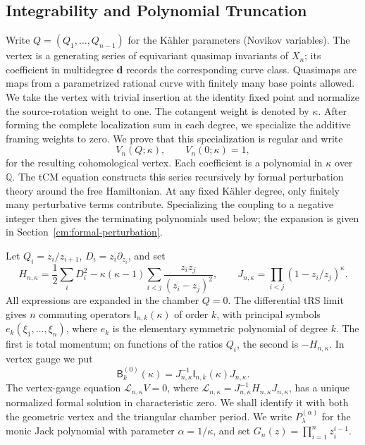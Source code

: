 \documentclass[11pt]{amsart}
\theoremstyle{definition}
\theoremstyle{remark}
\numberwithin{equation}{section}
\newcommand{\Q}{\mathbb Q}
\begin{document}
\subsection{Integrability and Polynomial Truncation}
Write $Q=(Q_1,\ldots,Q_{n-1})$ for the K\"ahler parameters
(Novikov variables). The vertex is a generating series of
equivariant quasimap invariants of $X_n$; its coefficient in
multidegree $\boldsymbol d$ records the corresponding curve class.
Quasimaps are maps from a parametrized
rational curve with finitely many base points allowed.
We take the vertex with trivial insertion at the identity
fixed point and normalize the source-rotation weight to one.
The cotangent weight is denoted by $\kappa$. After forming the
complete localization sum in each degree, we specialize the
additive framing weights to zero. We prove that this
specialization is regular and write
\[
 V_n(Q;\kappa),\qquad V_n(0;\kappa)=1,
\]
for the resulting cohomological vertex. Each coefficient is a
polynomial in $\kappa$ over $\Q$.
The tCM equation constructs this series recursively by formal
perturbation theory around the free Hamiltonian. At any fixed
K\"ahler degree, only finitely many perturbative terms contribute.
Specializing the coupling to a negative integer then gives the
terminating polynomials used below; the expansion is given in
Section~\ref{cm:formal-perturbation}.

Let $Q_i=z_i/z_{i+1}$, $D_i=z_i\partial_{z_i}$, and set
\begin{equation}\label{in:calogero}
 H_{n,\kappa}=\frac12\sum_iD_i^2
 -\kappa(\kappa-1)\sum_{i<j}\frac{z_iz_j}{(z_i-z_j)^2},
 \qquad
 J_{n,\kappa}=\prod_{i<j}(1-z_i/z_j)^\kappa.
\end{equation}
All expressions are expanded in the chamber $Q=0$.
The differential tRS limit gives $n$ commuting operators
$\mathsf I_{n,k}(\kappa)$ of order $k$, with principal symbols
$e_k(\xi_1,\ldots,\xi_n)$, where $e_k$ is the elementary
symmetric polynomial of degree $k$.
The first is total momentum; on functions of the ratios $Q_i$,
the second is $-H_{n,\kappa}$. In vertex
gauge we put
\[
 \mathsf B_k^{(0)}(\kappa)
 =J_{n,\kappa}^{-1}\mathsf I_{n,k}(\kappa)J_{n,\kappa}.
\]
The vertex-gauge equation
$\mathcal L_{n,\kappa}V=0$, where
$\mathcal L_{n,\kappa}=J_{n,\kappa}^{-1}H_{n,\kappa}J_{n,\kappa}$,
has a unique normalized formal solution in characteristic zero.
We shall identify it with both the
geometric vertex and the triangular chamber period.
We write $P_\lambda^{(\alpha)}$ for the monic Jack polynomial
with parameter $\alpha=1/\kappa$, and set
$G_n(z)=\prod_{i=1}^n z_i^{i-1}$.
\end{document}
